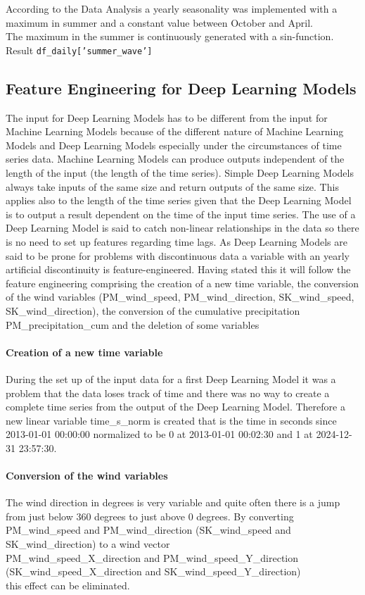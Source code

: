 \documentclass[a4paper,12pt]{article}
\begin{document}
According to the Data Analysis a yearly seasonality was implemented with a maximum in summer and a constant value between October and April.\\
The maximum in the summer is continuously generated with a sin-function.
Result \texttt{df\_daily['summer\_wave']}

\subsection{Feature Engineering for Deep Learning Models}

The input for Deep Learning Models has to be different from the input for Machine Learning Models because of the different nature of Machine Learning Models and Deep Learning Models especially under the circumstances of time series data. Machine Learning Models can produce outputs independent of the length of the input (the length of the time series). Simple Deep Learning Models always take inputs of the same size and return outputs of the same size. This applies also to the length of the time series given that the Deep Learning Model is to output a result dependent on the time of the input time series. The use of a Deep Learning Model is said to catch non-linear relationships in the data so there is no need to set up features regarding time lags. As Deep Learning Models are said to be prone for problems with discontinuous data a variable with an yearly artificial discontinuity is feature-engineered. Having stated this it will follow the feature engineering comprising the creation of a new time variable, the conversion of the wind variables (PM\_wind\_speed, PM\_wind\_direction, SK\_wind\_speed, SK\_wind\_direction), the conversion of the cumulative precipitation PM\_precipitation\_cum and the deletion of some variables

\paragraph{Creation of a new time variable}
During the set up of the input data for a first Deep Learning Model it was a problem that the data loses track of time and there was no way to create a complete time series from the output of the Deep Learning Model. Therefore a new linear variable time\_s\_norm is created that is the time in seconds since 2013-01-01 00:00:00 normalized to be 0 at 2013-01-01 00:02:30 and 1 at 2024-12-31 23:57:30.

\paragraph{Conversion of the wind variables}
The wind direction in degrees is very variable and quite often there is a jump from just below 360 degrees to just above 0 degrees. By converting PM\_wind\_speed and PM\_wind\_direction (SK\_wind\_speed and SK\_wind\_direction) to a wind vector\\PM\_wind\_speed\_X\_direction and PM\_wind\_speed\_Y\_direction\\(SK\_wind\_speed\_X\_direction and SK\_wind\_speed\_Y\_direction)\\this effect can be eliminated.
\end{document}
